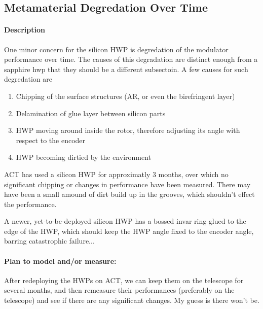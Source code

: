 \subsection{Metamaterial Degredation Over Time}

\paragraph{Description} 

One minor concern for the silicon HWP is degredation of the modulator performance over time. The causes of this degradation are distinct enough from a sapphire hwp that they should be a different subsectoin.  A few causes for such degredation are

\begin{enumerate}
	\item Chipping of the surface structures (AR, or even the birefringent layer)
	\item Delamination of glue layer between silicon parts
	\item HWP moving around inside the rotor, therefore adjusting its angle with respect to the encoder
	\item HWP becoming dirtied by the environment
\end{enumerate}

ACT has used a silicon HWP for approximatly 3 months, over which no significant chipping or changes in performance have been measured.  There may have been a small amound of dirt build up in the grooves, which shouldn't effect the performance.

A newer, yet-to-be-deployed silicon HWP has a bossed invar ring glued to the edge of the HWP, which should keep the HWP angle fixed to the encoder angle, barring catastrophic failure...
  
\paragraph{Plan to model and/or measure:}

After redeploying the HWPs on ACT, we can keep them on the telescope for several months, and then remeasure their performances (preferably on the telescope) and see if there are any significant changes.  My guess is there won't be.


